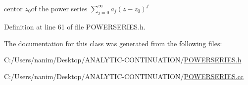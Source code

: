 centor $ z_0 $of the power series $ \displaystyle\sum_{j=0}^{\infty}{a_j (z - z_0)^j} $ 

Definition at line 61 of file P\+O\+W\+E\+R\+S\+E\+R\+I\+E\+S.\+h.



The documentation for this class was generated from the following files\+:\begin{DoxyCompactItemize}
\item 
C\+:/\+Users/nanim/\+Desktop/\+A\+N\+A\+L\+Y\+T\+I\+C-\/\+C\+O\+N\+T\+I\+N\+U\+A\+T\+I\+O\+N/\mbox{\hyperlink{_p_o_w_e_r_s_e_r_i_e_s_8h}{P\+O\+W\+E\+R\+S\+E\+R\+I\+E\+S.\+h}}\item 
C\+:/\+Users/nanim/\+Desktop/\+A\+N\+A\+L\+Y\+T\+I\+C-\/\+C\+O\+N\+T\+I\+N\+U\+A\+T\+I\+O\+N/\mbox{\hyperlink{_p_o_w_e_r_s_e_r_i_e_s_8cc}{P\+O\+W\+E\+R\+S\+E\+R\+I\+E\+S.\+cc}}\end{DoxyCompactItemize}
